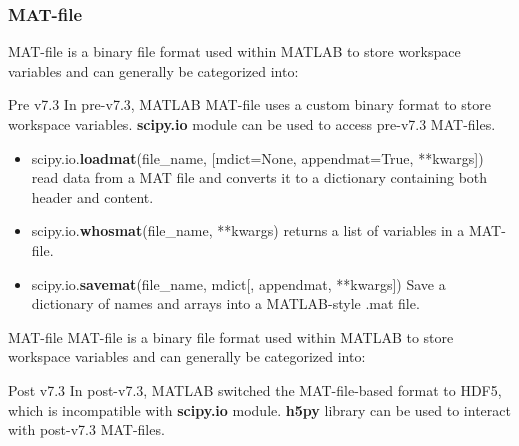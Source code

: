 \documentclass{beamer}
\begin{document}
    \begin{frame}
    \frametitle{MAT-file}
    MAT-file is a binary file format used within MATLAB to store workspace variables and can generally be categorized into:
        \begin{block}{Pre v7.3}
            In pre-v7.3, MATLAB MAT-file uses a custom binary format to store workspace variables. \textbf{scipy.io} module can be used to access pre-v7.3 MAT-files.
            \begin{itemize}
                \item scipy.io.\textbf{loadmat}(file\_name, [mdict=None, appendmat=True, **kwargs]) read data from a MAT file and converts it to a dictionary containing both header and content.
                \item scipy.io.\textbf{whosmat}(file\_name, **kwargs) returns a list of variables in a MAT-file.
                \item scipy.io.\textbf{savemat}(file\_name, mdict[, appendmat, **kwargs]) Save a dictionary of names and arrays into a MATLAB-style .mat file.
            \end{itemize}
        \end{block}
    \end{frame}

    \begin{frame}[fragile]{MAT-file}
    MAT-file is a binary file format used within MATLAB to store workspace variables and can generally be categorized into:
        \begin{block}{Post v7.3}
            In post-v7.3, MATLAB switched the MAT-file-based format to HDF5, which is incompatible with \textbf{scipy.io} module. \textbf{h5py} library can be used to interact with post-v7.3 MAT-files.
        \end{block}
    \end{frame}
\end{document}
